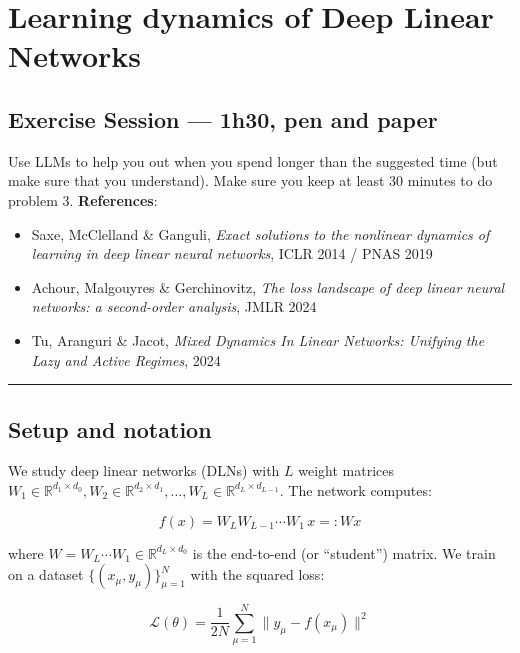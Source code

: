 \documentclass[
]{article}
\author{}
\date{}
\providecommand{\tightlist}{%
  \setlength{\itemsep}{0pt}\setlength{\parskip}{0pt}}
\begin{document}
\section{Learning dynamics of
Deep Linear Networks}\label{implicit-regularization-in-deep-linear-networks}

\subsection{Exercise Session --- 1h30, pen and
paper}\label{exercise-session-1h30-pen-and-paper}
Use LLMs to help you out when you spend longer than the suggested time (but make sure that you understand). Make sure you keep at least 30 minutes to do problem 3.
\textbf{References}:

\begin{itemize}
\tightlist
\item
  Saxe, McClelland \& Ganguli, \emph{Exact solutions to the nonlinear
  dynamics of learning in deep linear neural networks}, ICLR 2014 / PNAS
  2019
\item
  Achour, Malgouyres \& Gerchinovitz, \emph{The loss landscape of deep
  linear neural networks: a second-order analysis}, JMLR 2024
\item
  Tu, Aranguri \& Jacot, \emph{Mixed Dynamics In Linear Networks:
  Unifying the Lazy and Active Regimes}, 2024
\end{itemize}

\begin{center}\rule{0.5\linewidth}{0.5pt}\end{center}

\subsection{Setup and notation}\label{setup-and-notation}

We study deep linear networks (DLNs) with \(L\) weight matrices
\(W_1 \in \mathbb{R}^{d_1 \times d_0}, W_2 \in \mathbb{R}^{d_2 \times d_1}, \ldots, W_L \in \mathbb{R}^{d_L \times d_{L-1}}\).
The network computes:

\[f(x) = W_L W_{L-1} \cdots W_1 \, x =: W x\]

where \(W = W_L \cdots W_1 \in \mathbb{R}^{d_L \times d_0}\) is the
end-to-end (or ``student'') matrix. We train on a dataset
\(\{(x_\mu, y_\mu)\}_{\mu=1}^N\) with the squared loss:

\[\mathcal{L}(\theta) = \frac{1}{2N} \sum_{\mu=1}^{N} \|y_\mu - f(x_\mu)\|^2\]
\end{document}
